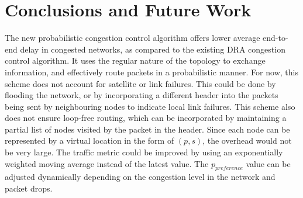 \documentclass[10pt,conference, final, letterpaper]{IEEEtran}
\begin{document}
\section{Conclusions and Future Work}
The new probabilistic congestion control algorithm offers lower average end-to-end delay in congested networks, as compared to the existing DRA congestion control algorithm. It uses the regular nature of the topology to exchange information, and effectively route packets in a probabilistic manner. For now, this scheme does not account for satellite or link failures. This could be done by flooding the network, or by incorporating a different header into the packets being sent by neighbouring nodes to indicate local link failures. This scheme also does not ensure loop-free routing, which can be incorporated by maintaining a partial list of nodes visited by the packet in the header. Since each node can be represented by a virtual location in the form of $(p,s)$, the overhead would not be very large. The traffic metric could be improved by using an exponentially weighted moving average instead of the latest value. The $p_{preference}$ value can be adjusted dynamically depending on the congestion level in the network and packet drops.  


\end{document}
